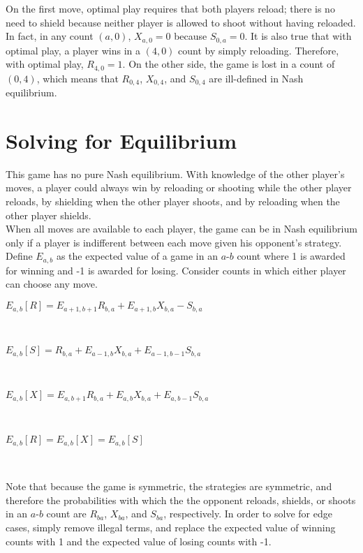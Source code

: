 \documentclass[11pt]{article}
\begin{document}
\begin{multicols}{2}
On the first move, optimal play requires that both players reload; there is no need to shield because neither player is allowed to shoot without having reloaded. In fact, in any count $(a, 0)$, $X_{a,0} = 0$ because $S_{0,a} = 0$. It is also true that with optimal play, a player wins in a $(4, 0)$ count by simply reloading. Therefore, with optimal play, $R_{4,0} = 1$. On the other side, the game is lost in a count of $(0, 4)$, which means that $R_{0,4}$, $X_{0,4}$, and $S_{0,4}$ are ill-defined in Nash equilibrium.

\section{Solving for Equilibrium}

This game has no pure Nash equilibrium. With knowledge of the other player's moves, a player could always win by reloading or shooting while the other player reloads, by shielding when the other player shoots, and by reloading when the other player shields.
\\

When all moves are available to each player, the game can be in Nash equilibrium only if a player is indifferent between each move given his opponent's strategy. Define $E_{a,b}$ as the expected value of a game in an $a$-$b$ count where 1 is awarded for winning and -1 is awarded for losing. Consider counts in which either player can choose any move.
\\

\begin{center}

$E_{a,b}[R] = E_{a+1,b+1}R_{b,a} + E_{a+1,b}X_{b,a} - S_{b,a}$

\

$E_{a,b}[S] = R_{b,a} + E_{a-1,b}X_{b,a} + E_{a-1,b-1}S_{b,a}$

\

$E_{a,b}[X] = E_{a,b+1}R_{b,a} + E_{a,b}X_{b,a} + E_{a,b-1}S_{b,a}$

\

$E_{a,b}[R] = E_{a,b}[X] = E_{a,b}[S]$

\

\end{center}

Note that because the game is symmetric, the strategies are symmetric, and therefore the probabilities with which the the opponent reloads, shields, or shoots in an $a$-$b$ count are $R_{ba}$, $X_{ba}$, and $S_{ba}$, respectively. In order to solve for edge cases, simply remove illegal terms, and replace the expected value of winning counts with 1 and the expected value of losing counts with -1.
\\


\end{multicols}
\end{document}

